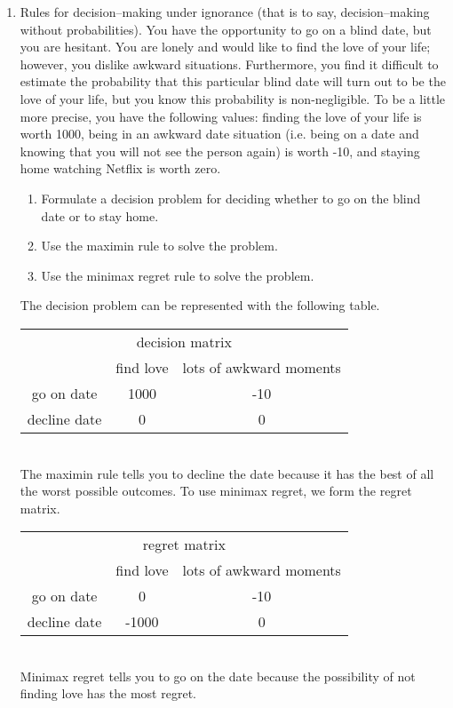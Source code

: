 \begin{enumerate}

\item Rules for decision--making under ignorance (that is to
  say, decision--making without probabilities). You have the opportunity to go on a
  blind date, but you are hesitant.  You are lonely and would like to
  find the love of your life; however, you dislike awkward
  situations. Furthermore, you find it difficult to estimate the
  probability that this particular blind date will turn out to be the
  love of your life, but you know this probability is
  non-negligible. To be a little more precise, you have the following
  values: finding the love of your life is worth 1000, being in an
  awkward date situation (i.e. being on a date and knowing that you
  will not see the person again) is worth -10, and staying home
  watching Netflix is worth zero.

\begin{enumerate}
\item Formulate a decision problem for deciding whether to go on the
blind date or to stay home.
\item Use the maximin rule to solve the problem.
\item Use the minimax regret rule to solve the problem.
\end{enumerate}

\begin{solution}
\bs The decision problem can be represented with the following table.
\\[.2in]
\begin{tabular}{ccc}
\multicolumn{3}{c}{decision matrix} \\
 & find love & lots of awkward moments \\ \hline
go on date & 1000 & -10 \\
decline date & 0 & 0 
\end{tabular}
\\[.2in] 
The maximin rule tells you to decline the date because it has
the best of all the worst possible outcomes. To use minimax regret, we
form the regret matrix.  \\[.2in]
\begin{tabular}{ccc}
\multicolumn{3}{c}{regret matrix} \\
 & find love & lots of awkward moments \\ \hline
go on date & 0 & -10 \\
decline date & -1000 & 0
\end{tabular}
\\[.2in] Minimax regret tells you to go on the date because the
possibility of not finding love has the most regret.
\end{solution}



\end{enumerate}
